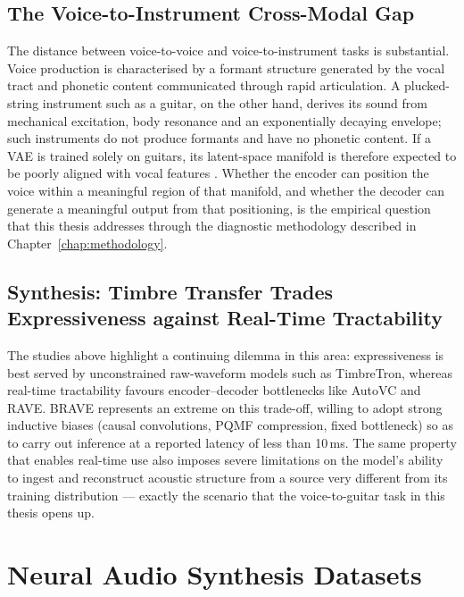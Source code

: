 \documentclass[a4paper,11pt,oneside,openany]{book}
\begin{document}
\subsection*{The Voice-to-Instrument Cross-Modal Gap}\label{subsec:cross_modal_gap}

The distance between voice-to-voice and voice-to-instrument tasks is substantial. Voice production is characterised by a formant structure generated by the vocal tract and phonetic content communicated through rapid articulation. A plucked-string instrument such as a guitar, on the other hand, derives its sound from mechanical excitation, body resonance and an exponentially decaying envelope; such instruments do not produce formants and have no phonetic content. If a VAE is trained solely on guitars, its latent-space manifold is therefore expected to be poorly aligned with vocal features \parencite{kingma2013vae,caillon2021rave}. Whether the encoder can position the voice within a meaningful region of that manifold, and whether the decoder can generate a meaningful output from that positioning, is the empirical question that this thesis addresses through the diagnostic methodology described in Chapter~\ref{chap:methodology}.

\subsection*{Synthesis: Timbre Transfer Trades Expressiveness against Real-Time Tractability}

The studies above highlight a continuing dilemma in this area: expressiveness is best served by unconstrained raw-waveform models such as TimbreTron, whereas real-time tractability favours encoder--decoder bottlenecks like AutoVC and RAVE. BRAVE represents an extreme on this trade-off, willing to adopt strong inductive biases (causal convolutions, PQMF compression, fixed bottleneck) so as to carry out inference at a reported latency of less than 10\,ms. The same property that enables real-time use also imposes severe limitations on the model's ability to ingest and reconstruct acoustic structure from a source very different from its training distribution --- exactly the scenario that the voice-to-guitar task in this thesis opens up.

\section{Neural Audio Synthesis Datasets}\label{sec:nas_datasets}
\end{document}
